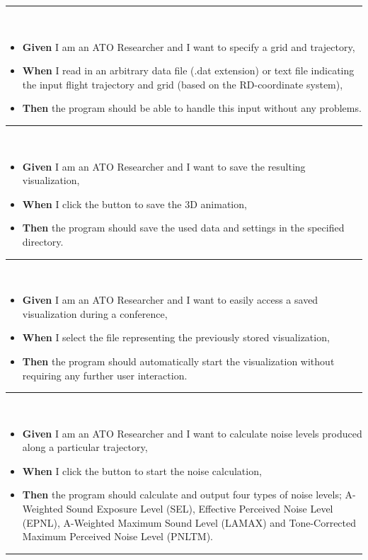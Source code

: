 \noindent\rule{8cm}{0.4pt} \\
\begin{itemize}
\item \textbf{Given} I am an ATO Researcher and I want to specify a grid and trajectory,
\item \textbf{When} I read in an arbitrary data file (.dat extension) or text file indicating the input flight trajectory and grid (based on the RD-coordinate system),
\item \textbf{Then} the program should be able to handle this input without any problems.
\end{itemize}
\noindent\rule{8cm}{0.4pt}\\
\begin{itemize}
\item \textbf{Given} I am an ATO Researcher and I want to save the resulting visualization,
\item \textbf{When} I click the button to save the 3D animation,
\item \textbf{Then} the program should save the used data and settings in the specified directory.
\end{itemize}
\noindent\rule{8cm}{0.4pt}\\
\begin{itemize}
\item \textbf{Given} I am an ATO Researcher and I want to easily access a saved visualization during a conference, 
\item \textbf{When} I select the file representing the previously stored visualization,
\item \textbf{Then} the program should automatically start the visualization without requiring any further user interaction.
\end{itemize}
\noindent\rule{8cm}{0.4pt} \\
\begin{itemize}
\item \textbf{Given} I am an ATO Researcher and I want to calculate noise levels produced along a particular trajectory,
\item \textbf{When} I click the button to start the noise calculation,
\item \textbf{Then} the program should calculate and output four types of noise levels; A-Weighted Sound Exposure Level (SEL), Effective Perceived Noise Level (EPNL), A-Weighted Maximum Sound Level (LAMAX) and Tone-Corrected Maximum Perceived Noise Level (PNLTM).
\end{itemize}
\noindent\rule{8cm}{0.4pt} \\

